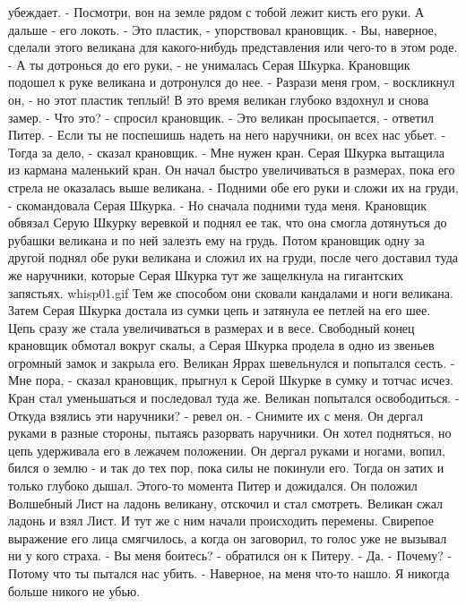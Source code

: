 убеждает.
    - Посмотри, вон на земле рядом с тобой лежит кисть его руки. А 
дальше - его локоть.
    - Это пластик, - упорствовал крановщик. - Вы, наверное, сделали 
этого великана для какого-нибудь представления или чего-то в этом 
роде.
    - А ты дотронься до его руки, - не унималась Серая Шкурка.
    Крановщик подошел к руке великана и дотронулся до нее.
    - Разрази меня гром, - воскликнул он, - но этот пластик теплый!
    В это время великан глубоко вздохнул и снова замер.
    - Что это? - спросил крановщик.
    - Это великан просыпается, - ответил Питер. - Если ты не поспешишь 
надеть на него наручники, он всех нас убьет.
    - Тогда за дело, - сказал крановщик. - Мне нужен кран.
    Серая Шкурка вытащила из кармана маленький кран. Он начал быстро 
увеличиваться в размерах, пока его стрела не оказалась выше великана.
    - Подними обе его руки и сложи их на груди, - скомандовала Серая 
Шкурка. - Но сначала подними туда меня.
    Крановщик обвязал Серую Шкурку веревкой и поднял ее так, что она 
смогла дотянуться до рубашки великана и по ней залезть ему на грудь. 
Потом крановщик одну за другой поднял обе руки великана и сложил их на 
груди, после чего доставил туда же наручники, которые Серая Шкурка тут 
же защелкнула на гигантских запястьях.
    {whisp01.gif}
    Тем же способом они сковали кандалами и ноги великана. Затем Серая 
Шкурка достала из сумки цепь и затянула ее петлей на его шее. Цепь 
сразу же стала увеличиваться в размерах и в весе. Свободный конец 
крановщик обмотал вокруг скалы, а Серая Шкурка продела в одно из 
звеньев огромный замок и закрыла его.
    Великан Яррах шевельнулся и попытался сесть.
    - Мне пора, - сказал крановщик, прыгнул к Серой Шкурке в сумку и 
тотчас исчез. Кран стал уменьшаться и последовал туда же.
    Великан попытался освободиться.
    - Откуда взялись эти наручники? - ревел он. - Снимите их с меня.
Он дергал руками в разные стороны, пытаясь разорвать наручники. Он 
хотел подняться, но цепь удерживала его в лежачем положении. Он дергал 
руками и ногами, вопил, бился о землю - и так до тех пор, пока силы не 
покинули его. Тогда он затих и только глубоко дышал.
    Этого-то момента Питер и дожидался. Он положил Волшебный Лист на 
ладонь великану, отскочил и стал смотреть. Великан сжал ладонь и взял 
Лист. И тут же с ним начали происходить перемены. Свирепое выражение 
его лица смягчилось, а когда он заговорил, то голос уже не вызывал ни 
у кого страха.
    - Вы меня боитесь? - обратился он к Питеру.
    - Да.
    - Почему?
    - Потому что ты пытался нас убить.
    - Наверное, на меня что-то нашло. Я никогда больше никого не убью. 
